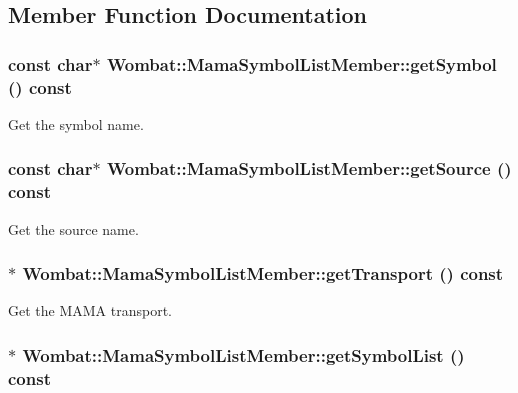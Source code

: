 \subsection{Member Function Documentation}
\hypertarget{classWombat_1_1MamaSymbolListMember_a1135197846cf6490585c3df77ea63274}{
\subsubsection[{getSymbol}]{\setlength{\rightskip}{0pt plus 5cm}const char$\ast$ Wombat::MamaSymbolListMember::getSymbol () const}}
\label{classWombat_1_1MamaSymbolListMember_a1135197846cf6490585c3df77ea63274}


Get the symbol name. \hypertarget{classWombat_1_1MamaSymbolListMember_a99e2897642ef172ab36dec52d065bc1f}{
\subsubsection[{getSource}]{\setlength{\rightskip}{0pt plus 5cm}const char$\ast$ Wombat::MamaSymbolListMember::getSource () const}}
\label{classWombat_1_1MamaSymbolListMember_a99e2897642ef172ab36dec52d065bc1f}


Get the source name. \hypertarget{classWombat_1_1MamaSymbolListMember_a50cb26c6342b9184f292201b00671362}{
\subsubsection[{getTransport}]{$\ast$ Wombat::MamaSymbolListMember::getTransport () const}}
\label{classWombat_1_1MamaSymbolListMember_a50cb26c6342b9184f292201b00671362}


Get the MAMA transport. \hypertarget{classWombat_1_1MamaSymbolListMember_a9cbe372a97a3fb7ce1596c28a5577495}{
\subsubsection[{getSymbolList}]{$\ast$ Wombat::MamaSymbolListMember::getSymbolList () const}}
\label{classWombat_1_1MamaSymbolListMember_a9cbe372a97a3fb7ce1596c28a5577495}


